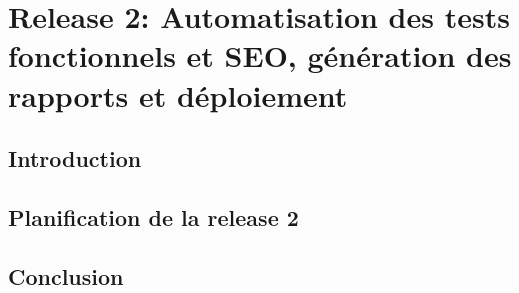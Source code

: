 \chapter{Release 2: Automatisation des tests fonctionnels et SEO, génération des rapports et déploiement}
\renewcommand{\thesection}{\arabic{section}}
\begin{justify}
    \vspace{-0.8cm}
    \section*{\texorpdfstring{Introduction}{Introduction}}
    
    \section{Planification de la release 2}
    
    
    
    
    \section*{\texorpdfstring{Conclusion}{Conclusion}}
    
\end{justify}
